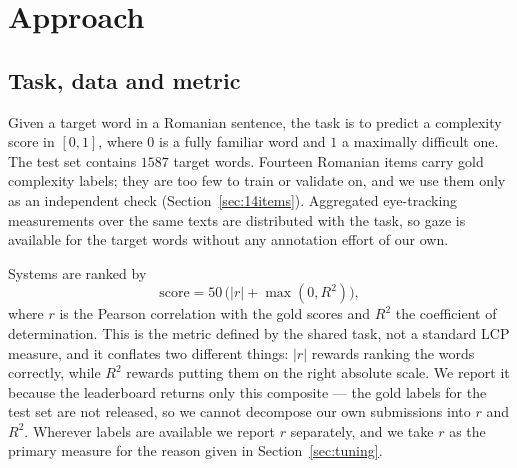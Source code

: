 %
%

\section{Approach}
\label{section:approach}

\subsection{Task, data and metric}

Given a target word in a Romanian sentence, the task is to predict a
complexity score in $[0,1]$, where $0$ is a fully familiar word and $1$
a maximally difficult one. The test set contains $1587$ target words.
Fourteen Romanian items carry gold complexity labels; they are too few
to train or validate on, and we use them only as an independent check
(Section~\ref{sec:14items}). Aggregated eye-tracking measurements over
the same texts are distributed with the task, so gaze is available for
the target words without any annotation effort of our own.

Systems are ranked by
\begin{equation}
  \label{eq:metric}
  \mathrm{score} = 50\,\bigl(|r| + \max(0, R^2)\bigr),
\end{equation}
where $r$ is the Pearson correlation with the gold scores and $R^2$ the
coefficient of determination. This is the metric defined by the shared
task, not a standard LCP measure, and it conflates two different
things: $|r|$ rewards ranking the words correctly, while $R^2$ rewards
putting them on the right absolute scale. We report it because the
leaderboard returns only this composite --- the gold labels for the
test set are not released, so we cannot decompose our own submissions
into $r$ and $R^2$. Wherever labels are available we report $r$
separately, and we take $r$ as the primary measure for the reason given
in Section~\ref{sec:tuning}.

